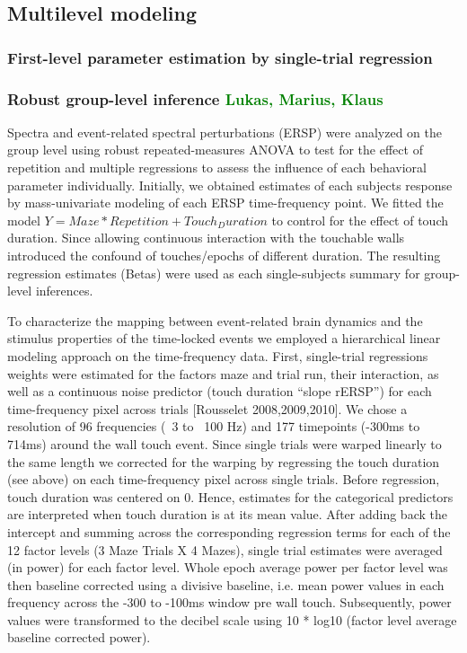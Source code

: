 \subsection{Multilevel modeling}
\subsubsection{First-level parameter estimation by single-trial regression}

\subsubsection{Robust group-level inference \textcolor{green}{Lukas, Marius, Klaus}}

Spectra and event-related spectral perturbations (ERSP\citep{Makeig2004}) were analyzed on the group level using robust repeated-measures ANOVA\citep{Pernet2011} to test for the effect of repetition and multiple regressions to assess the influence of each behavioral parameter individually. Initially, we obtained estimates of each subjects response by mass-univariate modeling of each ERSP time-frequency point. We fitted the model $Y = Maze*Repetition + Touch_Duration$ to control for the effect of touch duration. Since allowing continuous interaction with the touchable walls introduced the confound of touches/epochs of different duration. The resulting regression estimates (Betas) were used as each single-subjects summary for group-level inferences.

To characterize the mapping between event-related brain dynamics and the stimulus properties of the time-locked events we employed a hierarchical linear modeling approach on the time-frequency data. First, single-trial regressions weights were estimated for the factors maze and trial run, their interaction, as well as a continuous noise predictor (touch duration “slope rERSP”) for each time-frequency pixel across trials [Rousselet 2008,2009,2010]. We chose a resolution of 96 frequencies  (~3 to ~100 Hz) and 177 timepoints (-300ms to 714ms) around the wall touch event. Since single trials were warped linearly to the same length we corrected for the warping by regressing the touch duration (see above) on each time-frequency pixel across single trials. Before regression, touch duration was centered on 0. Hence, estimates for the categorical predictors are interpreted when touch duration is at its mean value. After adding back the intercept and summing across the corresponding regression terms for each of the 12 factor levels (3 Maze Trials X 4 Mazes), single trial estimates were averaged (in power) for each factor level. Whole epoch average power per factor level was then baseline corrected using a divisive baseline, i.e. mean power values in each frequency across the -300 to -100ms window pre wall touch. Subsequently, power values were transformed to the decibel scale using 10 * log10 (factor level average baseline corrected power).

